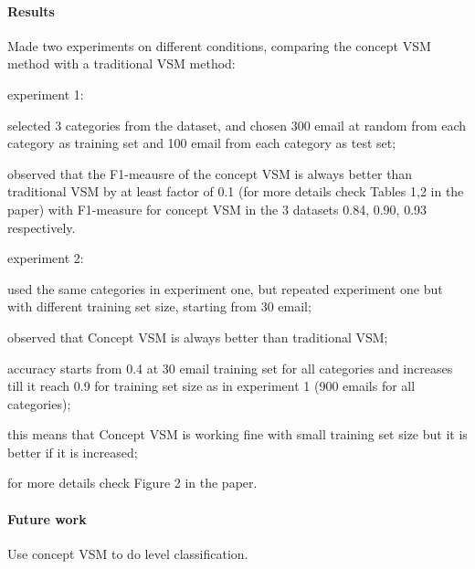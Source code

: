 \documentclass[12pt]{article}
\newenvironment{my_itemize}
{\begin{itemize}
  \setlength{\itemsep}{0cm}
  \setlength{\parskip}{0cm}}
{\end{itemize}}
\begin{document}
\paragraph{Results}
\begin{my_itemize}
  \item Made two experiments on different conditions, comparing the concept VSM method with a traditional VSM method:
  \begin{my_itemize}
    \item experiment 1:
    \begin{my_itemize}
      \item selected 3 categories from the dataset, and chosen 300 email at random 
	    from each category as training set and 100 email from each category as 
	    test set;
      \item observed that the F1-meausre of the concept VSM is always better than 
	    traditional VSM by at least factor of 0.1 (for more details check 
	    Tables 1,2 in the paper) with F1-measure for concept VSM in the 3 
	    datasets 0.84, 0.90, 0.93 respectively.
    \end{my_itemize}
    \item experiment 2:
    \begin{my_itemize}
      \item used the same categories in experiment one, but repeated experiment 
	    one but with different training set size, starting from 30 email;
      \item observed that Concept VSM is always better than traditional VSM;
      \item accuracy starts from 0.4 at 30 email training set for all categories 
	    and increases till it reach 0.9 for training set size as in 
	    experiment 1 (900 emails for all categories);
      \item this means that Concept VSM is working fine with small training set 
	    size but it is better if it is increased;
      \item for more details check Figure 2 in the paper.
    \end{my_itemize}
  \end{my_itemize}
\end{my_itemize}

\paragraph{Future work}
Use concept VSM to do level classification.
\end{document}
